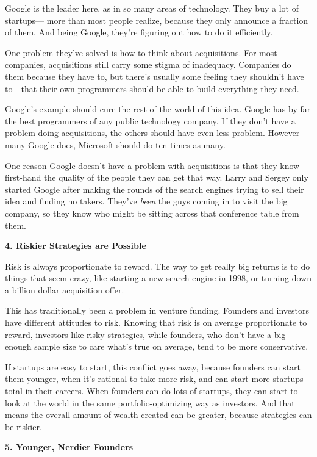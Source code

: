 Google is the leader here, as in so many areas of technology. They buy a
lot of startups--- more than most people realize, because they only
announce a fraction of them. And being Google, they're figuring out how
to do it efficiently.

One problem they've solved is how to think about acquisitions. For most
companies, acquisitions still carry some stigma of inadequacy. Companies
do them because they have to, but there's usually some feeling they
shouldn't have to---that their own programmers should be able to build
everything they need.

Google's example should cure the rest of the world of this idea. Google
has by far the best programmers of any public technology company. If
they don't have a problem doing acquisitions, the others should have
even less problem. However many Google does, Microsoft should do ten
times as many.

One reason Google doesn't have a problem with acquisitions is that they
know first-hand the quality of the people they can get that way. Larry
and Sergey only started Google after making the rounds of the search
engines trying to sell their idea and finding no takers. They've
\emph{been} the guys coming in to visit the big company, so they know
who might be sitting across that conference table from them.

\textbf{4. Riskier Strategies are Possible}

Risk is always proportionate to reward. The way to get really big
returns is to do things that seem crazy, like starting a new search
engine in 1998, or turning down a billion dollar acquisition offer.

This has traditionally been a problem in venture funding. Founders and
investors have different attitudes to risk. Knowing that risk is on
average proportionate to reward, investors like risky strategies, while
founders, who don't have a big enough sample size to care what's true on
average, tend to be more conservative.

If startups are easy to start, this conflict goes away, because founders
can start them younger, when it's rational to take more risk, and can
start more startups total in their careers. When founders can do lots of
startups, they can start to look at the world in the same
portfolio-optimizing way as investors. And that means the overall amount
of wealth created can be greater, because strategies can be riskier.

\textbf{5. Younger, Nerdier Founders}

